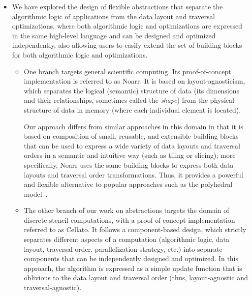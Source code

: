 \begin{itemize}
  \item We have explored the design of flexible abstractions that separate the algorithmic logic of applications from the data layout and traversal optimizations, where both algorithmic logic and optimizations are expressed in the same high-level language and can be designed and optimized independently, also allowing users to easily extend the set of building blocks for both algorithmic logic and optimizations.
  \begin{itemize}
    \item One branch targets general scientific computing. Its proof-of-concept implementation is referred to as Noarr. It is based on layout-agnosticism, which separates the logical (semantic) structure of data (its dimensions and their relationships, sometimes called the \emph{shape}) from the physical structure of data in memory (where each individual element is located).

    Our approach differs from similar approaches in this domain in that it is based on composition of small, reusable, and extensible building blocks that can be used to express a wide variety of data layouts and traversal orders in a semantic and intuitive way (such as tiling or slicing); more specifically, Noarr uses the same building blocks to express both data layouts and traversal order transformations. Thus, it provides a powerful and flexible alternative to popular approaches such as the polyhedral model~\cite{feautrier1992some,bondhugula2008pluto}.
    \item The other branch of our work on abstractions targets the domain of discrete stencil computations, with a proof-of-concept implementation referred to as Cellato. It follows a component-based design, which strictly separates different aspects of a computation (algorithmic logic, data layout, traversal order, parallelization strategy, etc.) into separate components that can be independently designed and optimized. In this approach, the algorithm is expressed as a simple update function that is oblivious to the data layout and traversal order (thus, layout-agnostic and traversal-agnostic).


\end{itemize}
\end{itemize}

